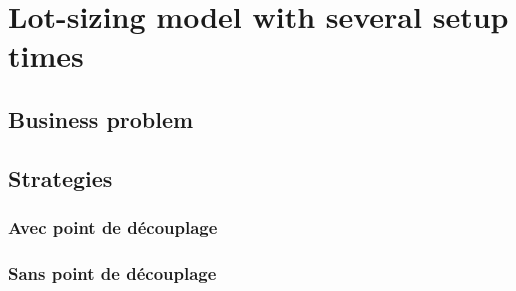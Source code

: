 \chapter{Lot-sizing model with several setup times}


\section{Business problem}


\section{Strategies}

\subsection{Avec point de découplage}

\subsection{Sans point de découplage}




